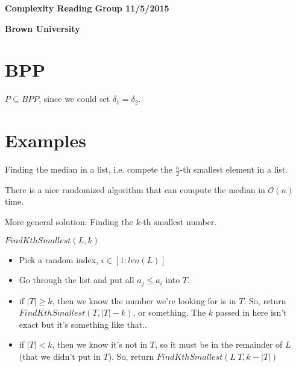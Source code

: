 \documentclass[11pt]{article} %
\begin{document}
\centerline{\LARGE{\bf Complexity Reading Group 11/5/2015}}
\vspace{2mm}
\centerline{\Large {\bf Brown University}}

\section{BPP}





 $P \subseteq BPP$, since we could set $\delta_1 = \delta_2$.

\midline

\section{Examples} 

 Finding the median in a list, i.e. compete the $\frac{n}{2}$-th smallest element in a list.

There is a nice randomized algorithm that can compute the median in $\mathcal{O}(n)$ time.

More general solution: Finding the $k$-th smallest number. 

 $FindKthSmallest(L,k)$
\begin{itemize}
\item Pick a random index, $i \in [1:len(L)]$
\item Go through the list and put all $a_j \leq a_i$ into $T$.
\item if $|T| \geq k$, then we know the number we're looking for is in $T$. So, return $FindKthSmallest(T, |T| - k)$, or something. The $k$ passed in here isn't exact but it's something like that..
\item if $|T| < k$, then we know it's not in $T$, so it must be in the remainder of $L$ (that we didn't put in $T$). So, return $FindKthSmallest(L \ T, k - |T|)$
\end{itemize}
\end{document}
